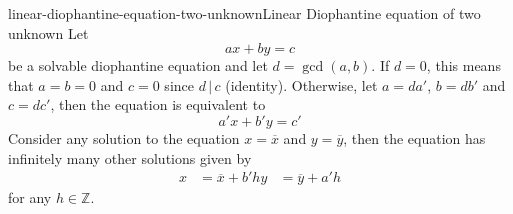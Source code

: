 \documentclass[preview]{standalone}
\newcommand{\divides}{\,|\,}
\begin{document}
\begin{snippetproposition}{linear-diophantine-equation-two-unknown}{Linear Diophantine equation of two unknown}
    Let \[ax+by=c\] be a solvable diophantine equation
    and let \(d = \gcd(a,b)\).
    If \(d=0\), this means that \(a=b=0\) and \(c=0\) since \(d \divides c\) (identity).
    Otherwise, let \(a=da'\), \(b=db'\) and \(c=dc'\), then the equation is equivalent to
    \[
        a'x + b'y = c'
    \]
    Consider any solution to the equation \(x=\overline{x}\) and \(y=\overline{y}\),
    then the equation has infinitely many other solutions given by
    \begin{align*}
        x &= \overline{x} + b'h
        y &= \overline{y} + a'h
    \end{align*}
    for any \(h \in \mathbb{Z}\).
\end{snippetproposition}

\end{document}
